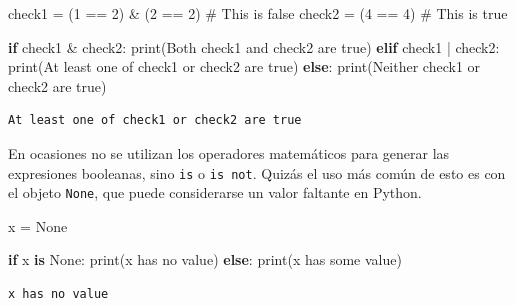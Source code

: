 \documentclass[
  letterpaper,
]{scrbook}
\newenvironment{Shaded}{\begin{snugshade}}{\end{snugshade}}
\newcommand{\BuiltInTok}[1]{\textcolor[rgb]{0.00,0.23,0.31}{#1}}
\newcommand{\CommentTok}[1]{\textcolor[rgb]{0.37,0.37,0.37}{#1}}
\newcommand{\ControlFlowTok}[1]{\textcolor[rgb]{0.00,0.23,0.31}{\textbf{#1}}}
\newcommand{\DecValTok}[1]{\textcolor[rgb]{0.68,0.00,0.00}{#1}}
\newcommand{\KeywordTok}[1]{\textcolor[rgb]{0.00,0.23,0.31}{\textbf{#1}}}
\newcommand{\NormalTok}[1]{\textcolor[rgb]{0.00,0.23,0.31}{#1}}
\newcommand{\OperatorTok}[1]{\textcolor[rgb]{0.37,0.37,0.37}{#1}}
\newcommand{\StringTok}[1]{\textcolor[rgb]{0.13,0.47,0.30}{#1}}
\newcommand{\VariableTok}[1]{\textcolor[rgb]{0.07,0.07,0.07}{#1}}
\begin{document}
\begin{Shaded}
\begin{Highlighting}[]
\NormalTok{check1 }\OperatorTok{=}\NormalTok{ (}\DecValTok{1} \OperatorTok{==} \DecValTok{2}\NormalTok{) }\OperatorTok{\&}\NormalTok{ (}\DecValTok{2} \OperatorTok{==} \DecValTok{2}\NormalTok{) }\CommentTok{\# This is false}
\NormalTok{check2 }\OperatorTok{=}\NormalTok{ (}\DecValTok{4} \OperatorTok{==} \DecValTok{4}\NormalTok{)            }\CommentTok{\# This is true}

\ControlFlowTok{if}\NormalTok{ check1 }\OperatorTok{\&}\NormalTok{ check2:}
  \BuiltInTok{print}\NormalTok{(}\StringTok{\textquotesingle{}Both check1 and check2 are true\textquotesingle{}}\NormalTok{)}
\ControlFlowTok{elif}\NormalTok{ check1 }\OperatorTok{|}\NormalTok{ check2:}
  \BuiltInTok{print}\NormalTok{(}\StringTok{\textquotesingle{}At least one of check1 or check2 are true\textquotesingle{}}\NormalTok{)}
\ControlFlowTok{else}\NormalTok{:}
  \BuiltInTok{print}\NormalTok{(}\StringTok{\textquotesingle{}Neither check1 or check2 are true\textquotesingle{}}\NormalTok{)}
\end{Highlighting}
\end{Shaded}

\begin{verbatim}
At least one of check1 or check2 are true
\end{verbatim}

En ocasiones no se utilizan los operadores matemáticos para generar las
expresiones booleanas, sino \texttt{is} o \texttt{is\ not}. Quizás el
uso más común de esto es con el objeto \texttt{None}, que puede
considerarse un valor faltante en Python.

\begin{Shaded}
\begin{Highlighting}[]
\NormalTok{x }\OperatorTok{=} \VariableTok{None}

\ControlFlowTok{if}\NormalTok{ x }\KeywordTok{is} \VariableTok{None}\NormalTok{:}
  \BuiltInTok{print}\NormalTok{(}\StringTok{\textquotesingle{}x has no value\textquotesingle{}}\NormalTok{)}
\ControlFlowTok{else}\NormalTok{:}
  \BuiltInTok{print}\NormalTok{(}\StringTok{\textquotesingle{}x has some value\textquotesingle{}}\NormalTok{)}
\end{Highlighting}
\end{Shaded}

\begin{verbatim}
x has no value
\end{verbatim}
\end{document}
